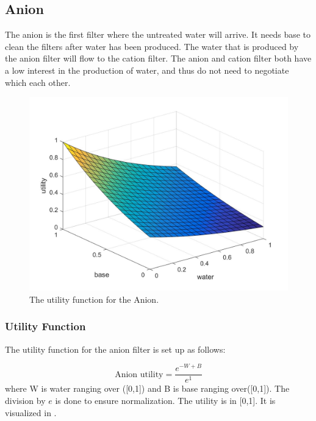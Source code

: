 
\subsection{Anion}
The anion is the first filter where the untreated water will arrive. It needs base to clean the filters after water has been produced. The water that is produced by the anion filter will flow to the cation filter. The anion and cation filter both have a low interest in the production of water, and thus do not need to negotiate which each other.%

\begin{figure}[h]
	\centering
	\includegraphics[width=0.7\linewidth]{img/Anion_utility}
	\caption{The utility function for the Anion.}
	\label{fig:anionutility}
\end{figure}

\subsubsection{Utility Function}
The utility function for the anion filter is set up as follows:

\[
\text{Anion utility} = \frac{e^{-W+B}}{e^1}
\]
where W is water ranging over ([0,1]) and B is base ranging over([0,1]). The division by $e$ is done to ensure normalization. The utility is in [0,1]. It is visualized in .

